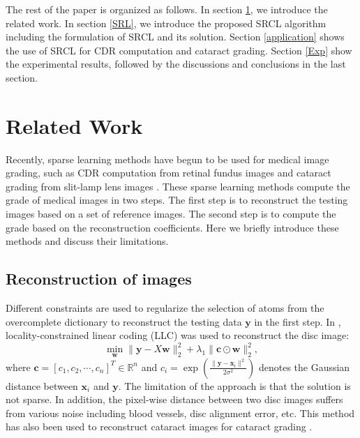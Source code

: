 \documentclass[journal]{IEEEtran}
\begin{document}
     The rest of the paper is organized as follows. In section \ref{related}, we introduce the related work. In section \ref{SRL}, we introduce  the proposed  SRCL algorithm including the formulation of SRCL and its solution.  Section \ref{application}
     shows the use of SRCL for CDR computation  and cataract grading.
     Section \ref{Exp} show the experimental results, followed by the discussions and conclusions in the last section.
     
     \section{Related Work} \label{related}
   Recently, sparse learning methods have begun to be used for medical image grading, such as CDR computation from retinal fundus images \cite{YW13, CJ15, Cheng:17BOE} and cataract grading from slit-lamp lens images \cite{Xu13}.  These sparse learning methods compute the grade of medical images in two steps. The first step is to  reconstruct the testing  images based on a set of reference   images. The second step is to compute the grade based on the reconstruction coefficients. Here we briefly introduce these methods and discuss their limitations.
    \subsection{Reconstruction of images}
        Different constraints are used to regularize the selection of atoms from the overcomplete dictionary to reconstruct the testing data $\textbf{y}$ in the first step. 
    In \cite{YW13},   locality-constrained linear coding (LLC) \cite{llc2010} was used to reconstruct the disc image:
        \begin{equation}
    \min_{\textbf{w}} \|{\textbf{y}}-{X}\textbf{w}\|^2_2+\lambda_1  \|\textbf{c}\odot \textbf{w}\|_2^2, \label{llcobj} 
    \end{equation} 
    where $\textbf{c}=[c_1, c_2, \cdots, c_n]^T\in \mathbb{R}^n$ and $c_i= \exp(\frac{\|\textbf{y}-\textbf{x}_i\|^2}{2\sigma^2})$ denotes the Gaussian distance  between $\textbf{x}_i$ and $\textbf{y}$.  
    The limitation of the approach is that the solution is not sparse. In addition, the pixel-wise distance between two disc
    images suffers from various noise including blood vessels, disc alignment error, etc.
  This method has also been used to reconstruct cataract images for cataract grading \cite{yanwu2016}.
    
\end{document}
